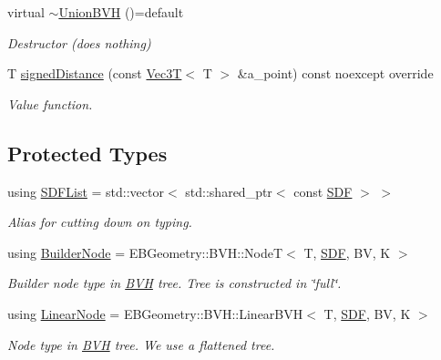 \begin{DoxyCompactItemize}
virtual \hyperlink{classUnionBVH_aac0a1f16ad0a273e72c8bcd15b80f336}{$\sim$\+Union\+B\+VH} ()=default
\begin{DoxyCompactList}\small\item\em Destructor (does nothing) \end{DoxyCompactList}\item 
T \hyperlink{classUnionBVH_a9681fdc161e2e077a33caaddb78fb4ba}{signed\+Distance} (const \hyperlink{classVec3T}{Vec3T}$<$ T $>$ \&a\+\_\+point) const noexcept override
\begin{DoxyCompactList}\small\item\em Value function. \end{DoxyCompactList}\end{DoxyCompactItemize}
\subsection*{Protected Types}
\begin{DoxyCompactItemize}
\item 
\mbox{\label{classUnionBVH_ac23ace50239fbe00130df2a7e42af995}} 
using \hyperlink{classUnionBVH_ac23ace50239fbe00130df2a7e42af995}{S\+D\+F\+List} = std\+::vector$<$ std\+::shared\+\_\+ptr$<$ const \hyperlink{classUnionBVH_a5d1d64d7cabf1000fc1a804d06e103cc}{S\+DF} $>$ $>$
\begin{DoxyCompactList}\small\item\em Alias for cutting down on typing. \end{DoxyCompactList}\item 
\mbox{\label{classUnionBVH_a9fd434576440274a81c0251962d7ff7e}} 
using \hyperlink{classUnionBVH_a9fd434576440274a81c0251962d7ff7e}{Builder\+Node} = E\+B\+Geometry\+::\+B\+V\+H\+::\+NodeT$<$ T, \hyperlink{classUnionBVH_a5d1d64d7cabf1000fc1a804d06e103cc}{S\+DF}, BV, K $>$
\begin{DoxyCompactList}\small\item\em Builder node type in \hyperlink{namespaceBVH}{B\+VH} tree. Tree is constructed in \char`\"{}full\char`\"{}. \end{DoxyCompactList}\item 
\mbox{\label{classUnionBVH_a25cac5a9dc5396299f06399434ebe212}} 
using \hyperlink{classUnionBVH_a25cac5a9dc5396299f06399434ebe212}{Linear\+Node} = E\+B\+Geometry\+::\+B\+V\+H\+::\+Linear\+B\+VH$<$ T, \hyperlink{classUnionBVH_a5d1d64d7cabf1000fc1a804d06e103cc}{S\+DF}, BV, K $>$
\begin{DoxyCompactList}\small\item\em Node type in \hyperlink{namespaceBVH}{B\+VH} tree. We use a flattened tree. \end{DoxyCompactList}\end{DoxyCompactItemize}
